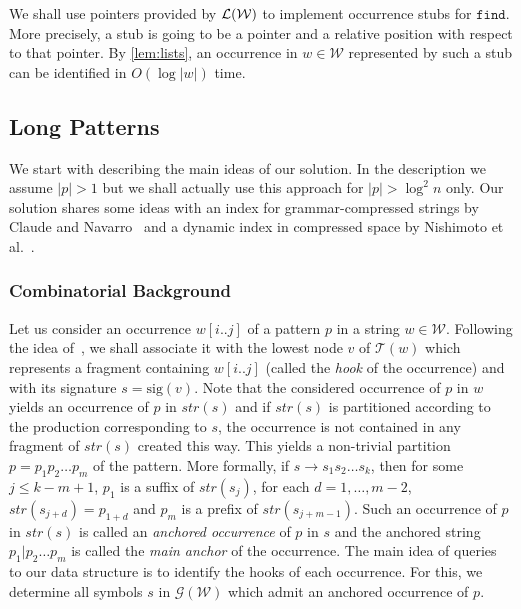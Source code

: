 \documentclass[a4paper]{article}
\theoremstyle{remark}
\newcommand{\findop}{\mathtt{find}}
\newcommand{\grammar}{\mathcal{G}}
\newcommand{\stree}{\mathcal{T}}
\newcommand{\sstr}{\textit{str}}
\newcommand{\ussig}{\mathrm{sig}}
\newcommand{\coll}{\mathcal{W}}
\begin{document}
We shall use pointers provided by $\lists(\coll)$ to implement occurrence stubs for $\findop$.
More precisely, a stub is going to be a pointer and a relative position with respect to that pointer.
By \cref{lem:lists}, an occurrence in $w\in \coll$ represented by such a stub can be identified in $O(\log |w|)$ time.

\subsection{Long Patterns}\label{sec:long}

We start with describing the main ideas of our solution. In the description we assume $|p|>1$ but we shall actually
use this approach for $|p|>\log^2 n$ only.
Our solution shares some ideas with an index for grammar-compressed strings by Claude and Navarro~\cite{DBLP:journals/fuin/ClaudeN11}
and a dynamic index in compressed space by Nishimoto et al.~\cite{DBLP:journals/corr/NishimotoIIBT15}.

\subsubsection{Combinatorial Background}
Let us consider an occurrence $w[i..j]$ of a pattern $p$ in a string $w\in \coll$.
Following the idea of~\cite{DBLP:journals/fuin/ClaudeN11}, we shall associate it with the lowest node $v$ of $\stree(w)$ which represents a fragment
containing $w[i..j]$ (called the \emph{hook} of the occurrence) and with its signature $s=\ussig(v)$.
Note that the considered occurrence of $p$ in $w$ yields an occurrence of $p$ in $\sstr(s)$
and if $\sstr(s)$ is partitioned according to the production corresponding to $s$, the occurrence
is not contained in any fragment of $\sstr(s)$ created this way.
This yields a non-trivial partition $p=p_1p_2\ldots p_m$ of the pattern.
More formally, if $s\to s_1s_2\ldots s_k$, then for some
$j\leq k-m+1$, $p_1$ is a suffix of $\sstr(s_j)$,
for each $d=1,\ldots,{m-2}$, $\sstr(s_{j+d})=p_{1+d}$
and $p_{m}$ is a prefix of $\sstr(s_{j+m-1})$.
Such an occurrence of $p$ in $\sstr(s)$ is called an \emph{anchored occurrence} of $p$ in $s$
and the anchored string $p_1|p_2\ldots p_m$ is called the \emph{main anchor} of the occurrence.
The main idea of queries to our data structure is to identify the hooks of each occurrence.
For this, we determine all symbols $s$ in $\grammar(\coll)$ which admit an anchored occurrence of $p$.
\end{document}
